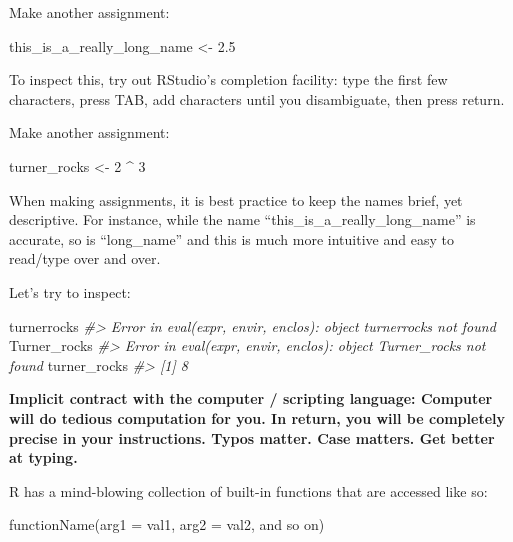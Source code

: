 \documentclass[
]{book}
\newenvironment{Shaded}{\begin{snugshade}}{\end{snugshade}}
\newcommand{\AttributeTok}[1]{\textcolor[rgb]{0.77,0.63,0.00}{#1}}
\newcommand{\CommentTok}[1]{\textcolor[rgb]{0.56,0.35,0.01}{\textit{#1}}}
\newcommand{\DecValTok}[1]{\textcolor[rgb]{0.00,0.00,0.81}{#1}}
\newcommand{\FloatTok}[1]{\textcolor[rgb]{0.00,0.00,0.81}{#1}}
\newcommand{\FunctionTok}[1]{\textcolor[rgb]{0.00,0.00,0.00}{#1}}
\newcommand{\NormalTok}[1]{#1}
\newcommand{\OtherTok}[1]{\textcolor[rgb]{0.56,0.35,0.01}{#1}}
\newcommand{\SpecialCharTok}[1]{\textcolor[rgb]{0.00,0.00,0.00}{#1}}
\begin{document}
Make another assignment:

\begin{Shaded}
\begin{Highlighting}[]
\NormalTok{this\_is\_a\_really\_long\_name }\OtherTok{\textless{}{-}} \FloatTok{2.5}
\end{Highlighting}
\end{Shaded}

To inspect this, try out RStudio's completion facility: type the first few characters, press TAB, add characters until you disambiguate, then press return.

Make another assignment:

\begin{Shaded}
\begin{Highlighting}[]
\NormalTok{turner\_rocks }\OtherTok{\textless{}{-}} \DecValTok{2} \SpecialCharTok{\^{}} \DecValTok{3}
\end{Highlighting}
\end{Shaded}

When making assignments, it is best practice to keep the names brief, yet descriptive. For instance, while the name ``this\_is\_a\_really\_long\_name'' is accurate, so is ``long\_name'' and this is much more intuitive and easy to read/type over and over.

Let's try to inspect:

\begin{Shaded}
\begin{Highlighting}[]
\NormalTok{turnerrocks}
\CommentTok{\#\textgreater{} Error in eval(expr, envir, enclos): object \textquotesingle{}turnerrocks\textquotesingle{} not found}
\NormalTok{Turner\_rocks}
\CommentTok{\#\textgreater{} Error in eval(expr, envir, enclos): object \textquotesingle{}Turner\_rocks\textquotesingle{} not found}
\NormalTok{turner\_rocks}
\CommentTok{\#\textgreater{} [1] 8}
\end{Highlighting}
\end{Shaded}

\textbf{Implicit contract with the computer / scripting language: Computer will do tedious computation for you. In return, you will be completely precise in your instructions. Typos matter. Case matters. Get better at typing.}

R has a mind-blowing collection of built-in functions that are accessed like so:

\begin{Shaded}
\begin{Highlighting}[]
\FunctionTok{functionName}\NormalTok{(}\AttributeTok{arg1 =}\NormalTok{ val1, }\AttributeTok{arg2 =}\NormalTok{ val2, and so on)}
\end{Highlighting}
\end{Shaded}
\end{document}
